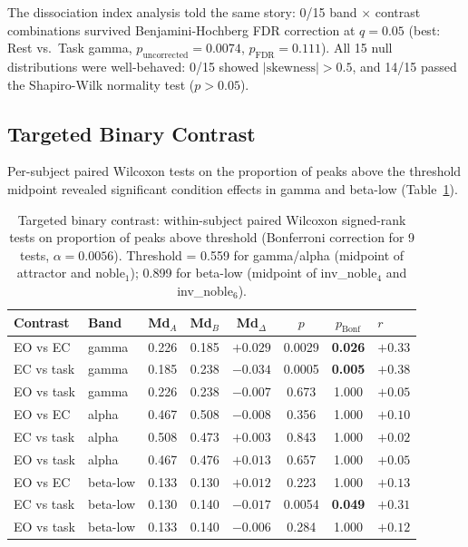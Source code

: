 \documentclass[11pt,a4paper]{article}
\begin{document}
The dissociation index analysis told the same story: 0/15 band $\times$ contrast combinations survived Benjamini-Hochberg FDR correction at $q = 0.05$ (best: Rest vs.\ Task gamma, $p_{\text{uncorrected}} = 0.0074$, $p_{\text{FDR}} = 0.111$). All 15 null distributions were well-behaved: 0/15 showed $|\text{skewness}| > 0.5$, and 14/15 passed the Shapiro-Wilk normality test ($p > 0.05$).

\subsection{Targeted Binary Contrast}
\label{sec:targeted_results}

Per-subject paired Wilcoxon tests on the proportion of peaks above the threshold midpoint revealed significant condition effects in gamma and beta-low (Table~\ref{tab:targeted}).

\begin{table}[H]
\centering
\caption{Targeted binary contrast: within-subject paired Wilcoxon signed-rank tests on proportion of peaks above threshold (Bonferroni correction for 9 tests, $\alpha = 0.0056$). Threshold = 0.559 for gamma/alpha (midpoint of attractor and noble$_1$); 0.899 for beta-low (midpoint of inv\_noble$_4$ and inv\_noble$_6$).}
\label{tab:targeted}
\begin{tabular}{@{}llcccccl@{}}
\toprule
Contrast & Band & Md$_A$ & Md$_B$ & Md$_\Delta$ & $p$ & $p_{\text{Bonf}}$ & $r$ \\
\midrule
EO vs EC & gamma & 0.226 & 0.185 & $+0.029$ & 0.0029 & \textbf{0.026} & $+0.33$ \\
EC vs task & gamma & 0.185 & 0.238 & $-0.034$ & 0.0005 & \textbf{0.005} & $+0.38$ \\
EO vs task & gamma & 0.226 & 0.238 & $-0.007$ & 0.673 & 1.000 & $+0.05$ \\
\midrule
EO vs EC & alpha & 0.467 & 0.508 & $-0.008$ & 0.356 & 1.000 & $+0.10$ \\
EC vs task & alpha & 0.508 & 0.473 & $+0.003$ & 0.843 & 1.000 & $+0.02$ \\
EO vs task & alpha & 0.467 & 0.476 & $+0.013$ & 0.657 & 1.000 & $+0.05$ \\
\midrule
EO vs EC & beta-low & 0.133 & 0.130 & $+0.012$ & 0.223 & 1.000 & $+0.13$ \\
EC vs task & beta-low & 0.130 & 0.140 & $-0.017$ & 0.0054 & \textbf{0.049} & $+0.31$ \\
EO vs task & beta-low & 0.133 & 0.140 & $-0.006$ & 0.284 & 1.000 & $+0.12$ \\
\bottomrule
\end{tabular}
\end{table}
\end{document}

